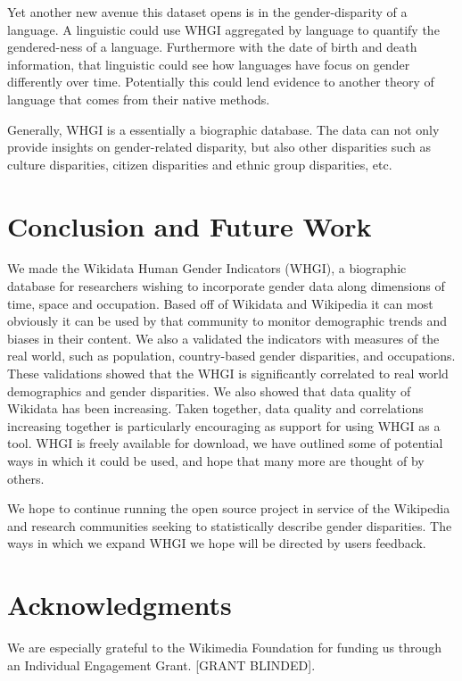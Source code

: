 \documentclass[letterpaper]{article}
\begin{document}
Yet another new avenue this dataset opens is in the gender-disparity of a language. A linguistic could use WHGI aggregated by language to quantify the gendered-ness of a language. Furthermore with the date of birth and death information, that linguistic could see how languages have focus on gender differently over time. Potentially this could lend evidence to another theory of language that comes from their native methods. 

Generally, WHGI is a essentially a biographic database. The data can not only provide insights on gender-related disparity, but also other disparities such as culture disparities, citizen disparities and ethnic group disparities, etc.  

\section{Conclusion and Future Work}
We made the Wikidata Human Gender Indicators (WHGI), a biographic database for researchers wishing to incorporate gender data along dimensions of time, space and occupation. Based off of Wikidata and Wikipedia it can most obviously it can be used by that community to monitor demographic trends and biases in their content. We also a validated the indicators with measures of the real world, such as population, country-based gender disparities, and occupations. These validations showed that the WHGI is significantly correlated to real world demographics and gender disparities. We also showed that data quality of Wikidata has been increasing. Taken together, data quality and correlations increasing together is particularly encouraging as support for using WHGI as a tool. WHGI is freely available for download, we have outlined some of potential ways in which it could be used, and hope that many more are thought of by others.

We hope to continue running the open source project in service of the Wikipedia and research communities seeking to statistically describe gender disparities. The ways in which we expand WHGI we hope will be directed by users feedback.


\section{ Acknowledgments}
We are especially grateful to the Wikimedia Foundation for funding us through an Individual Engagement Grant. [GRANT BLINDED].



\end{document}
